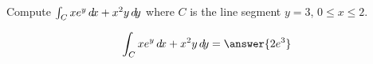 \documentclass{ximera}
\author{David Guichard \and Neal Koblitz \and H. Jerome Keisler \and Albert Scheller \and Barry Balof \and Mike Wills \and Matthew Carr}
\begin{document}
\begin{exercise}




Compute $\int_C xe^y\mathop{}\!d\! x+x^2 y\mathop{}\!d\! y$ where $C$ is the line segment $y=3$, $0\le x\le 2$.

\begin{prompt}
\[
\int_C xe^y\d x+x^2 y\d y=\answer{2e^3}
\]
\end{prompt}



\end{exercise}
\end{document}
